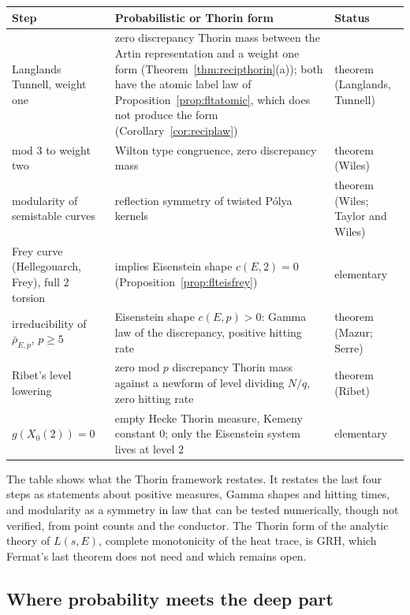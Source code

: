 \begin{center}\small
\begin{tabular}{@{}p{}p{}p{}@{}}
\toprule
\raggedright Step & \raggedright Probabilistic or Thorin form & \raggedright Status\tabularnewline
\midrule
\raggedright Langlands Tunnell, weight one & \raggedright zero discrepancy Thorin mass between the Artin representation and a weight one form (Theorem~\ref{thm:recipthorin}(a)); both have the atomic label law of Proposition~\ref{prop:fltatomic}, which does not produce the form (Corollary~\ref{cor:reciplaw}) & \raggedright theorem (Langlands, Tunnell)\tabularnewline
\raggedright mod $3$ to weight two & \raggedright Wilton type congruence, zero discrepancy mass & \raggedright theorem (Wiles)\tabularnewline
\raggedright modularity of semistable curves & \raggedright reflection symmetry of twisted P\'olya kernels & \raggedright theorem (Wiles; Taylor and Wiles)\tabularnewline
\raggedright Frey curve (Hellegouarch, Frey), full $2$ torsion & \raggedright implies Eisenstein shape $c(E,2)=0$ (Proposition~\ref{prop:flteisfrey}) & \raggedright elementary\tabularnewline
\raggedright irreducibility of $\bar\rho_{E,p}$, $p\ge5$ & \raggedright Eisenstein shape $c(E,p)>0$: Gamma law of the discrepancy, positive hitting rate & \raggedright theorem (Mazur; Serre)\tabularnewline
\raggedright Ribet's level lowering & \raggedright zero mod $p$ discrepancy Thorin mass against a newform of level dividing $N/q$, zero hitting rate & \raggedright theorem (Ribet)\tabularnewline
\raggedright $g(X_0(2))=0$ & \raggedright empty Hecke Thorin measure, Kemeny constant $0$; only the Eisenstein system lives at level $2$ & \raggedright elementary\tabularnewline
\bottomrule
\end{tabular}
\end{center}

The table shows what the Thorin framework restates. It restates the last four steps as statements about positive measures, Gamma shapes and hitting times, and modularity as a symmetry in law that can be tested numerically, though not verified, from point counts and the conductor. The Thorin form of the analytic theory of $L(s,E)$, complete monotonicity of the heat trace, is GRH, which Fermat's last theorem does not need and which remains open.

\subsection{Where probability meets the deep part}


